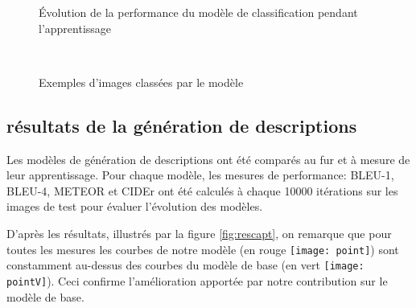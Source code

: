\begin{figure}[ht!]
     \begin{center}
%
    \end{center}
    \caption{%
        Évolution de la performance du modèle de classification pendant  l'apprentissage
     }%
   \label{fig:evolution}
\end{figure}

\begin{figure}[ht!]
     \begin{center}
%
        \\ %
%
    \end{center}
    \caption{%
        Exemples d'images classées par le modèle
     }%
   \label{fig:exclassif}
\end{figure}

\subsection{résultats de la génération de descriptions}

Les modèles de génération de descriptions ont été comparés au fur et à mesure de leur apprentissage. Pour chaque modèle, les mesures de performance: BLEU-1, BLEU-4, METEOR et CIDEr ont été calculés à chaque 10000 itérations sur les images de test pour évaluer l'évolution des modèles.

D'après les résultats, illustrés par la figure \ref{fig:rescapt}, on remarque que pour toutes les  mesures les courbes de notre modèle (en rouge \texttt{[image: point]}) sont constamment au-dessus des courbes du modèle de base (en vert \texttt{[image: pointV]}). Ceci confirme l'amélioration apportée par notre contribution sur le modèle de base. 

